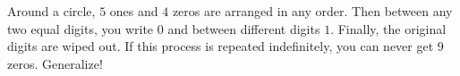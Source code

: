 Around a circle, $5$ ones and $4$ zeros are arranged in any order. Then between any two equal digits, you write $0$ and between different digits $1$. Finally, the original digits are wiped out. If this process is repeated indefinitely, you can never get $9$ zeros. Generalize!
